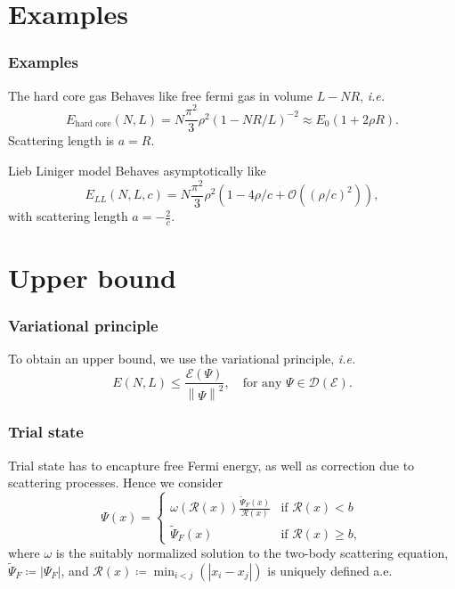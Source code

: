 \documentclass{beamer}[10]
\newcommand{\norm}[1]{\left\lVert #1 \right\rVert}
\newcommand{\abs}[1]{\left\lvert #1 \right\rvert}
\newcommand{\ie}{\emph{i.e.} }
\newcommand{\rr}{\mathcal{R}}
\begin{document}
\section{Examples}
\begin{frame}
	\frametitle{Examples}
	\begin{block}{The hard core gas}
		Behaves like free fermi gas in volume $ L-NR $, \ie \begin{equation}
		E_{\text{hard core}}(N,L)=N\frac{\pi^2}{3}\rho^2 (1-NR/L)^{-2}\approx E_0(1+2\rho R).
		\end{equation}
		Scattering length is $ a=R $.
	\end{block}
	\begin{block}{Lieb Liniger model}
		Behaves asymptotically like
		\begin{equation}
		E_{LL}(N,L,c)=N\frac{\pi^2}{3}\rho^2\left(1-4\rho/c+\mathcal{O}\left((\rho/c)^2\right)\right),
		\end{equation}
		with scattering length $ a=-\frac{2}{c} $.
	\end{block}
\end{frame}

\section{Upper bound}

\begin{frame}
	\frametitle{Variational principle}
	\begin{block}{}
		To obtain an upper bound, we use the variational principle, \ie
		$$
		E(N,L)\leq \frac{\mathcal{E}(\Psi)}{\norm{\Psi}^2},\quad \text{for any }  \Psi\in \mathcal{D}(\mathcal{E}) .
		$$
	\end{block}	
\end{frame}

\begin{frame}
	\frametitle{Trial state}
	\begin{block}{}
		Trial state has to encapture free Fermi energy, as well as correction due to scattering processes. Hence we consider $$
		\Psi(x)=\begin{cases}
		\omega(\rr(x))\frac{\tilde{\Psi}_F(x)}{\rr(x)}& \text{if }\rr(x)<b\\
		\tilde{\Psi}_F(x)&\text{if }\rr(x)\geq b,
		\end{cases}
		$$
		where $ \omega $ is the suitably normalized solution to the two-body scattering equation,  $ \tilde{\Psi}_F\coloneqq \abs{\Psi_F} $, and $ \rr(x)\coloneqq \min_{i<j}(\abs{x_i-x_j}) $ is uniquely defined a.e.
	\end{block}	
\end{frame}
\end{document}
